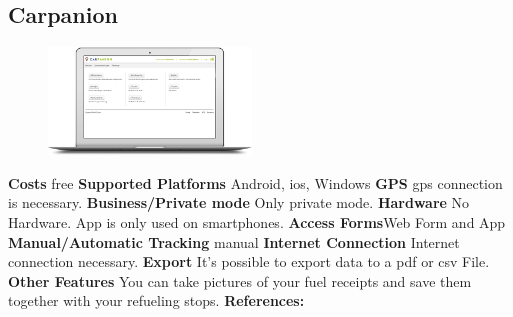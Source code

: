 \begin{singlespace}
\section{Carpanion}
\begin{figure}
  \begin{center}
    \includegraphics[width=0.48\textwidth]{bilder/Carpanion1}
  \end{center}
\end{figure}
\textbf{Costs} free
\newline\newline
\textbf{Supported Platforms} Android, \gls{ios}, Windows
\newline\newline
\textbf{GPS} \gls{gps} connection is necessary.
\newline\newline
\textbf{Business/Private mode} Only private mode.
\newline\newline
\textbf{Hardware} No Hardware. App is only used on smartphones.
\newline\newline
\textbf{Access Forms}Web Form and App
\newline\newline
\textbf{Manual/Automatic Tracking} manual
\newline\newline
\textbf{Internet Connection} Internet connection necessary.
\newline\newline
\textbf{Export} It’s possible to export data to a \gls{pdf} or \gls{csv} File.
\newline\newline
\textbf{Other Features} You can take pictures of your fuel receipts and save them together with your refueling stops.
\newline\newline
\textbf{References:} \cite{Carpanion}
\newpage


\end{singlespace}
